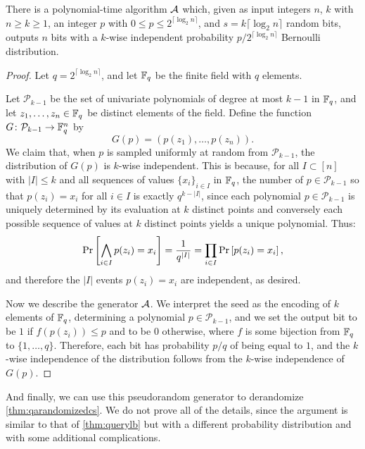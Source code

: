 \begin{theorem}
\label{thm:kwiseindepgen}
There is a polynomial-time algorithm $\mathcal{A}$ which, given as input integers $n$, $k$ with $n \geq k \geq 1$,
an integer $p$ with $0 \leq p \leq 2^{\lceil \log_2 n \rceil}$, and $s = k \lceil \log_2 n \rceil$
random bits, outputs $n$ bits with a $k$-wise independent probability $p/2^{\lceil \log_2 n \rceil}$ 
Bernoulli distribution.
\end{theorem}
\begin{proof}
Let $q = 2^{\lceil \log_2 n \rceil}$, and let $\mathbb{F}_q$ be the finite field with $q$ elements. 

Let $\mathcal{P}_{k-1}$ be the set of univariate polynomials of degree at most $k-1$ in $\mathbb{F}_q$,
and let $z_1, \ldots, z_n \in \mathbb{F}_q$ be distinct elements of the field. Define the function 
$G \colon \mathcal{P}_{k-1} \to \mathbb{F}^n_q$ by
$$
G(p) = (p(z_1), \ldots, p(z_n)).
$$
We claim that, when $p$ is sampled uniformly at random from $\mathcal{P}_{k-1}$, the distribution
of $G(p)$ is $k$-wise independent. This is because, for all $I \subset [n]$ with $|I| \leq k$ and 
all sequences of values $\{x_i\}_{i\in I}$ in $\mathbb{F}_q$, the number of $p \in \mathcal{P}_{k-1}$ so that 
$p(z_i) = x_i$ for all $i \in I$ is exactly $q^{k-|I|}$, since each polynomial $p \in \mathcal{P}_{k-1}$
is uniquely determined by its evaluation at $k$ distinct points and conversely each possible sequence 
of values at $k$ distinct points yields a unique polynomial. Thus:
$$
\text{Pr}\left[\bigwedge_{i\in I} p(z_i) = x_i\right] = \frac{1}{q^{|I|}} = \prod_{i\in I} \text{Pr}\left[p(z_i) = x_i\right],
$$
and therefore the $|I|$ events $p(z_i) = x_i$ are independent, as desired. 

Now we describe the generator $\mathcal{A}$. We interpret the seed as the encoding of $k$ elements of $\mathbb{F}_q$,
determining a polynomial $p \in \mathcal{P}_{k-1}$, and we set the output bit to be $1$ if 
$f(p(z_i)) \leq p$ and to be $0$ otherwise, where $f$ is some bijection from $\mathbb{F}_q$ to $\{1, \ldots, q\}$.
Therefore, each bit has probability $p/q$ of being equal to $1$, and the $k$-wise independence of the
distribution follows from the $k$-wise independence of $G(p)$. 
\end{proof}

And finally, we can use this pseudorandom generator to derandomize \cref{thm:qarandomizedcs}.
We do not prove all of the details, since the argument is similar to that of \cref{thm:querylb}
but with a different probability distribution and with some additional complications. 

